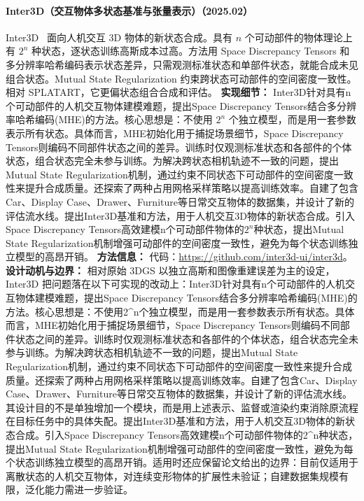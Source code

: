 \paragraph{Inter3D（交互物体多状态基准与张量表示）（2025.02）}
Inter3D~\cite{2502_14004} 面向人机交互 3D 物体的新状态合成。具有 $n$ 个可动部件的物体理论上有 $2^n$ 种状态，逐状态训练高斯成本过高。方法用 Space Discrepancy Tensors 和多分辨率哈希编码表示状态差异，只需观测标准状态和单部件状态，就能合成未见组合状态。Mutual State Regularization 约束跨状态可动部件的空间密度一致性。相对 SPLATART，它更偏状态组合合成和评估。
\textbf{实现细节：} Inter3D针对具有n个可动部件的人机交互物体建模难题，提出Space Discrepancy Tensors结合多分辨率哈希编码(MHE)的方法。核心思想是：不使用 $2^n$ 个独立模型，而是用一套参数表示所有状态。具体而言，MHE初始化用于捕捉场景细节，Space Discrepancy Tensors则编码不同部件状态之间的差异。训练时仅观测标准状态和各部件的个体状态，组合状态完全未参与训练。为解决跨状态相机轨迹不一致的问题，提出Mutual State Regularization机制，通过约束不同状态下可动部件的空间密度一致性来提升合成质量。还探索了两种占用网格采样策略以提高训练效率。自建了包含Car、Display Case、Drawer、Furniture等日常交互物体的数据集，并设计了新的评估流水线。提出Inter3D基准和方法，用于人机交互3D物体的新状态合成。引入Space Discrepancy Tensors高效建模n个可动部件物体的$2^n$种状态，提出Mutual State Regularization机制增强可动部件的空间密度一致性，避免为每个状态训练独立模型的高昂开销。
\textbf{方法信息：} 代码：\url{https://github.com/inter3d-ui/inter3d}。
\textbf{设计动机与边界：} 相对原始 3DGS 以独立高斯和图像重建误差为主的设定，Inter3D 把问题落在以下可实现的改动上：Inter3D针对具有n个可动部件的人机交互物体建模难题，提出Space Discrepancy Tensors结合多分辨率哈希编码(MHE)的方法。核心思想是：不使用2\^{}n个独立模型，而是用一套参数表示所有状态。具体而言，MHE初始化用于捕捉场景细节，Space Discrepancy Tensors则编码不同部件状态之间的差异。训练时仅观测标准状态和各部件的个体状态，组合状态完全未参与训练。为解决跨状态相机轨迹不一致的问题，提出Mutual State Regularization机制，通过约束不同状态下可动部件的空间密度一致性来提升合成质量。还探索了两种占用网格采样策略以提高训练效率。自建了包含Car、Display Case、Drawer、Furniture等日常交互物体的数据集，并设计了新的评估流水线。其设计目的不是单独增加一个模块，而是用上述表示、监督或渲染约束消除原流程在目标任务中的具体失配。提出Inter3D基准和方法，用于人机交互3D物体的新状态合成。引入Space Discrepancy Tensors高效建模n个可动部件物体的2\^{}n种状态，提出Mutual State Regularization机制增强可动部件的空间密度一致性，避免为每个状态训练独立模型的高昂开销。适用时还应保留论文给出的边界：目前仅适用于离散状态的人机交互物体，对连续变形物体的扩展性未验证；自建数据集规模有限，泛化能力需进一步验证。
